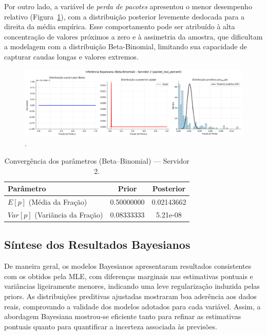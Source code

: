\documentclass{article}
\begin{document}
Por outro lado, a variável de \textit{perda de pacotes} apresentou o menor desempenho relativo
(Figura~\ref{fig:packet_loss_percent_bayesian_betabinomial_server02}),
com a distribuição posterior levemente deslocada para a direita da média empírica.
Esse comportamento pode ser atribuído à alta concentração de valores próximos a zero
e à assimetria da amostra, que dificultam a modelagem com a distribuição Beta-Binomial,
limitando sua capacidade de capturar caudas longas e valores extremos.

\begin{figure}[htp]
	\centering
	\includegraphics[width=\textwidth]{../figures/bayes/packet_loss_percent_bayesian_betabinomial_server02.png}
	\caption{.}
	\label{fig:packet_loss_percent_bayesian_betabinomial_server02}
\end{figure}

\begin{table}[htp]
	\centering
	\caption{Convergência dos parâmetros (Beta–Binomial) — Servidor 2.}
	\label{tab:bayes_beta_server02}
	\begin{tabular}{lcc}
		\hline
		\textbf{Parâmetro} & \textbf{Prior} & \textbf{Posterior} \\ \hline
		$E[p]$ (Média da Fração) & 0.50000000 & 0.02143662 \\
		$Var[p]$ (Variância da Fração) & 0.08333333 & 5.21e-08 \\ \hline
	\end{tabular}
\end{table}

\subsection{Síntese dos Resultados Bayesianos}

De maneira geral, os modelos Bayesianos apresentaram resultados consistentes com os obtidos
pela MLE, com diferenças marginais nas estimativas pontuais e variâncias ligeiramente menores,
indicando uma leve regularização induzida pelas priors.  
As distribuições preditivas ajustadas mostraram boa aderência aos dados reais, comprovando
a validade dos modelos adotados para cada variável.  
Assim, a abordagem Bayesiana mostrou-se eficiente tanto para refinar as estimativas
pontuais quanto para quantificar a incerteza associada às previsões.
\end{document}
